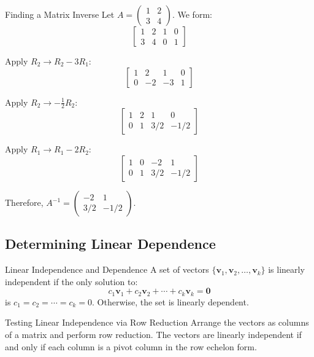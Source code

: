\documentclass[12pt,a4paper]{article}
\newcommand{\vv}[1]{\mathbf{#1}}
\newcommand{\vzero}{\mathbf{0}}
\begin{document}
	\begin{example}{Finding a Matrix Inverse}
		Let $A = \begin{pmatrix} 1 & 2 \\ 3 & 4 \end{pmatrix}$. We form:
		\[
		\left[\begin{array}{cc|cc}
			1 & 2 & 1 & 0 \\
			3 & 4 & 0 & 1
		\end{array}\right]
		\]
		
		Apply $R_2 \to R_2 - 3R_1$:
		\[
		\left[\begin{array}{cc|cc}
			1 & 2 & 1 & 0 \\
			0 & -2 & -3 & 1
		\end{array}\right]
		\]
		
		Apply $R_2 \to -\frac{1}{2}R_2$:
		\[
		\left[\begin{array}{cc|cc}
			1 & 2 & 1 & 0 \\
			0 & 1 & 3/2 & -1/2
		\end{array}\right]
		\]
		
		Apply $R_1 \to R_1 - 2R_2$:
		\[
		\left[\begin{array}{cc|cc}
			1 & 0 & -2 & 1 \\
			0 & 1 & 3/2 & -1/2
		\end{array}\right]
		\]
		
		Therefore, $A^{-1} = \begin{pmatrix} -2 & 1 \\ 3/2 & -1/2 \end{pmatrix}$.
	\end{example}
	
	\subsection{Determining Linear Dependence}
	
	\begin{definition}{Linear Independence and Dependence}
		A set of vectors $\{\vv{v}_1, \vv{v}_2, \ldots, \vv{v}_k\}$ is linearly independent if the only solution to:
		\[
		c_1\vv{v}_1 + c_2\vv{v}_2 + \cdots + c_k\vv{v}_k = \vzero
		\]
		is $c_1 = c_2 = \cdots = c_k = 0$. Otherwise, the set is linearly dependent.
	\end{definition}
	
	\begin{proposition}{Testing Linear Independence via Row Reduction}
		Arrange the vectors as columns of a matrix and perform row reduction. The vectors are linearly independent if and only if each column is a pivot column in the row echelon form.
	\end{proposition}
	
\end{document}
